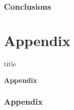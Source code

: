 \documentclass[11pt]{beamer}
\begin{document}
\begin{frame}

	\frametitle{\bfseries Conclusions}
\end{frame}


\section[]{Appendix}
\begin{frame}

	
	\begin{beamercolorbox}{title}
		\begin{center}
			\bfseries \huge Appendix
		\end{center}	
	\end{beamercolorbox}
	
\end{frame}

\begin{frame}
	
	\frametitle{\bfseries Appendix}
\end{frame}



\end{document}

